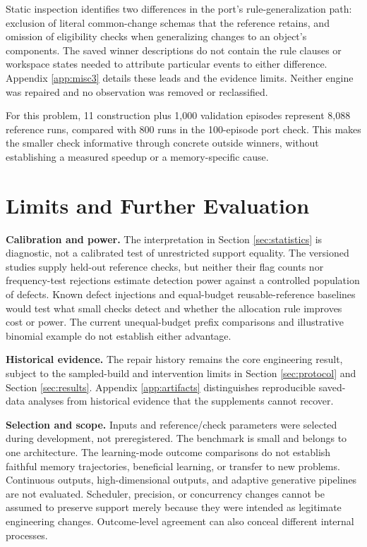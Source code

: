 \documentclass[10pt,letterpaper]{article}
\begin{document}
Static inspection identifies two differences in the port's rule-generalization path:
exclusion of literal common-change schemas that the reference retains, and omission of
eligibility checks when generalizing changes to an object's components. The saved winner
descriptions do not contain the rule clauses or workspace states needed to attribute
particular events to either difference. Appendix \ref{app:misc3} details these leads and
the evidence limits. Neither engine was repaired and no observation was removed or
reclassified.

For this problem, 11 construction plus 1,000 validation episodes represent 8,088 reference
runs, compared with 800 runs in the 100-episode port check. This makes the smaller check
informative through concrete outside winners, without establishing a measured speedup or a
memory-specific cause.

\section{Limits and Further Evaluation}\label{sec:limits}

\textbf{Calibration and power.} The interpretation in Section \ref{sec:statistics} is
diagnostic, not a calibrated test of unrestricted support equality. The versioned studies
supply held-out reference checks, but neither their flag counts nor frequency-test
rejections estimate detection power against a controlled population of defects. Known
defect injections and equal-budget reusable-reference baselines would test what small
checks detect and whether the allocation rule improves cost or power. The current
unequal-budget prefix comparisons and illustrative binomial example do not establish
either advantage.

\textbf{Historical evidence.} The repair history remains the core engineering result,
subject to the sampled-build and intervention limits in Section \ref{sec:protocol} and
Section \ref{sec:results}. Appendix \ref{app:artifacts} distinguishes reproducible
saved-data analyses from historical evidence that the supplements cannot recover.

\textbf{Selection and scope.} Inputs and reference/check parameters were selected during
development, not preregistered. The benchmark is small and belongs to one architecture.
The learning-mode outcome comparisons do not establish faithful memory trajectories,
beneficial learning, or transfer to new problems. Continuous outputs, high-dimensional
outputs, and adaptive generative pipelines are not evaluated. Scheduler, precision, or
concurrency changes cannot be assumed to preserve support merely because they were
intended as legitimate engineering changes. Outcome-level agreement can also conceal
different internal processes.
\end{document}
